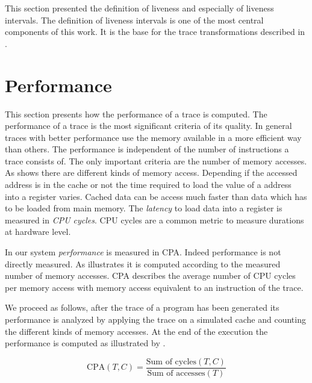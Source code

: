 \documentclass[onecolumn, openright, master, english, signatures]{dbrgrptt}
\begin{document}
This section presented the definition of liveness and especially of liveness intervals. The definition of liveness intervals is one of the most central components of this work. It is the base for the trace transformations described in .


\section{Performance}\label{sec:performance}

This section presents how the performance of a trace is computed. The performance of a trace is the most significant criteria of its quality. In general \ac{trace}s with better performance use the memory available in a more efficient way than others. The performance is independent of the number of instructions a \ac{trace} consists of. The only important criteria are the number of memory accesses. As  shows there are different kinds of memory access. Depending if the accessed address is in the cache or not the time required to load the value of a address into a register varies. Cached data can be access much faster than data which has to be loaded from main memory. The \emph{latency} to load data into a register is measured in \emph{\ac{CPU} cycles}. \ac{CPU} cycles are a common metric to measure durations at hardware level.

In our system \emph{performance} is measured in \ac{CPA}. Indeed performance is not directly measured. As  illustrates it is computed according to the measured number of memory accesses. \ac{CPA} describes the average number of \ac{CPU} cycles per memory access with memory access equivalent to an instruction of the trace.

We proceed as follows, after the \ac{trace} of a program has been generated its performance is analyzed by applying the trace on a simulated cache and counting the different kinds of memory accesses. At the end of the execution the performance is computed as illustrated by .

\begin{equation}\label{equ:performance-cpa}
\text{CPA}(T,C) = \frac{\text{Sum of cycles}(T, C)}{\text{Sum of accesses}(T)}
\end{equation}
\end{document}
